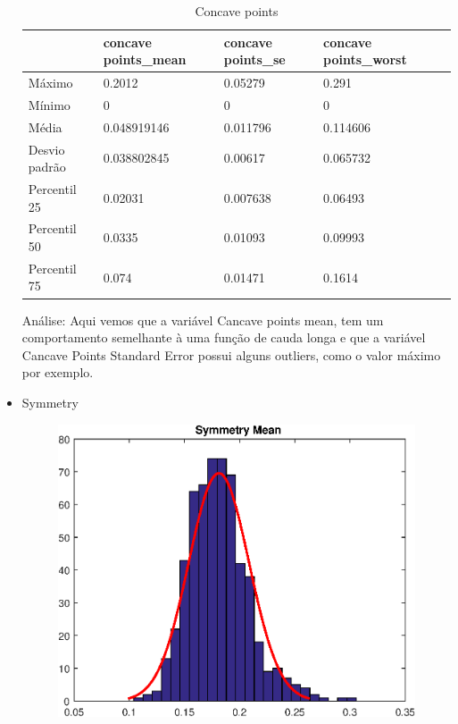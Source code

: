 \documentclass[11pt,a4paper]{article}
\numberwithin{equation}{section}
\begin{document}
\begin{itemize}
\begin{table}[H]
\centering
\caption{Concave points}
\label{my-label}
\begin{tabular}{lllll} \hline
              & concave points\_mean & concave points\_se & concave points\_worst &  \\ \hline
Máximo        & 0.2012               & 0.05279            & 0.291                 &  \\
Mínimo        & 0                    & 0                  & 0                     &  \\
Média         & 0.048919146          & 0.011796           & 0.114606              &  \\
Desvio padrão & 0.038802845          & 0.00617            & 0.065732              &  \\
Percentil 25  & 0.02031              & 0.007638           & 0.06493               &  \\
Percentil 50  & 0.0335               & 0.01093            & 0.09993               &  \\
Percentil 75  & 0.074                & 0.01471            & 0.1614                &  \\ \hline
\end{tabular}
\end{table}

Análise: Aqui vemos que a variável Cancave points mean, tem um comportamento semelhante  à uma função de cauda longa e que a variável Cancave Points Standard Error possui alguns outliers,  como o valor máximo por exemplo.

\item Symmetry
\begin{figure}[H]
\centering
  \includegraphics[width=.4\linewidth]{./img/symmetry_mean}
  \label{fig:test1}
\end{figure}%


\end{itemize}
\end{document}
